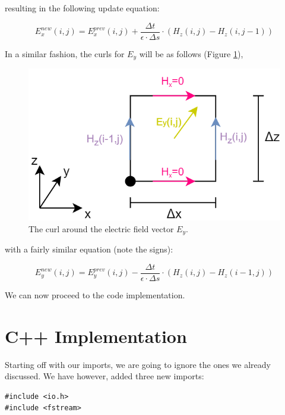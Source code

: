 resulting in the following update equation:

\begin{equation}
	\label{eqn:2dExCurlFinal}
	E_x^{new}(i,j) =  E_x^{prev}(i,j) + \frac{\Delta t}{\epsilon \cdot \Delta s} \cdot (H_z(i,j) - H_z(i,j-1))
\end{equation}

In a similar fashion, the curls for $E_y$ will be as follows (Figure \ref{fig:fdtd2dEy}),

\begin{figure}[h!]
	\centering
	\includegraphics[scale=0.6]{Figures/fdtd2dEy}
	\decoRule
	\caption[2D TE Mode - $E_y$ vector curl]{The curl around the electric field vector $E_y$.}
	\label{fig:fdtd2dEy}
\end{figure}

with a fairly similar equation (note the signs):

\begin{equation}
	\label{eqn:2dEyCurlFinal}
	E_y^{new}(i,j) =  E_y^{prev}(i,j) - \frac{\Delta t}{\epsilon \cdot \Delta s} \cdot (H_z(i,j) - H_z(i-1,j))
\end{equation}

We can now proceed to the code implementation.

\section{C++ Implementation}

Starting off with our imports, we are going to ignore the ones we already discussed. We have however, added three new imports:

\begin{verbatim}
#include <io.h>
#include <fstream>
\end{verbatim}


